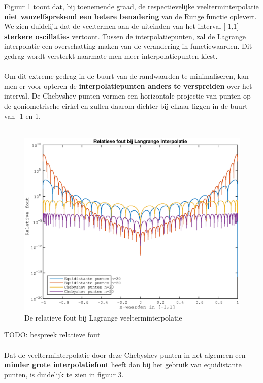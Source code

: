 \documentclass{article}
\begin{document}
Figuur 1 toont dat, bij toenemende graad, de respectievelijke veelterminterpolatie \textbf{niet vanzelfsprekend een betere benadering} van de Runge functie oplevert. We zien duidelijk dat de veeltermen aan de uiteinden van het interval [-1,1] \textbf{sterkere oscillaties} vertoont. Tussen de interpolatiepunten, zal de Lagrange interpolatie een overschatting maken van de verandering in functiewaarden. Dit gedrag wordt versterkt naarmate men meer interpolatiepunten kiest. 
\\  \\
Om dit extreme gedrag in de buurt van de randwaarden te minimaliseren, kan men er voor opteren de \textbf{interpolatiepunten anders te verspreiden} over het interval. De Chebyshev punten vormen een horizontale projectie van punten op de goniometrische cirkel en zullen daarom dichter bij elkaar liggen in de buurt van -1 en 1.  
\\ \\
\begin{center}
\begin{figure}[h!]
\includegraphics[width=0.60\columnwidth]{relatieve_fout}
\caption{De relatieve fout bij Lagrange veelterminterpolatie} %
\end{figure}
\end{center}

TODO: bespreek relatieve fout
\\ \\ 
Dat de veelterminterpolatie door deze Chebyshev punten in het algemeen een \textbf{minder grote interpolatiefout} heeft dan bij het gebruik van equidistante punten, is duidelijk te zien in figuur 3.
\end{document}
